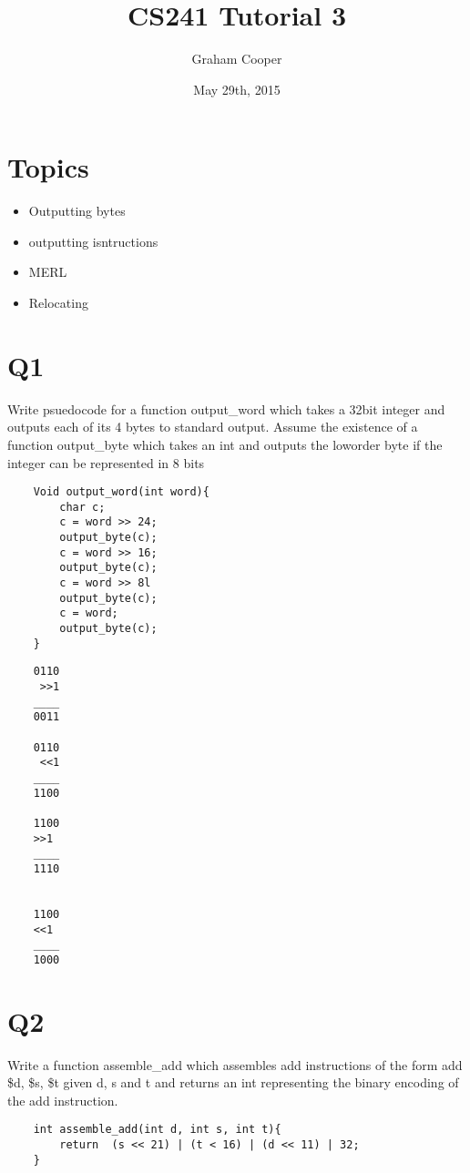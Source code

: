 \documentclass[12pt]{article}
\title{\vspace{-15ex}CS241 Tutorial 3\vspace{-1ex}}
\date{May 29th, 2015}
\author{Graham Cooper}
\begin{document}
	\maketitle
	\section*{Topics}
	\begin{itemize}
		\item Outputting bytes
		\item outputting isntructions
		\item MERL
		\item Relocating
	\end{itemize}
	
	\section*{Q1}
	Write psuedocode for a function output\_word which takes a 32\-bit integer and outputs each of its 4 bytes to standard output. Assume the existence of a function output\_byte which takes an int and outputs the low\-order byte if the integer can be represented in 8 bits\\
	
	\begin{verbatim}
	Void output_word(int word){
		char c;
		c = word >> 24;
		output_byte(c);
		c = word >> 16;
		output_byte(c);
		c = word >> 8l
		output_byte(c);
		c = word;
		output_byte(c);
	}
	\end{verbatim}
	
	\begin{verbatim}
	0110
	 >>1
	____
	0011
	
	0110
	 <<1
	____
	1100
	
	1100
	>>1
	____
	1110
	
	
	1100
	<<1
	____
	1000
	\end{verbatim}
	
	\section*{Q2}
	Write a function assemble\_add which assembles add instructions of the form add \$d, \$s, \$t given d, s and t and returns an int representing the binary encoding of the add instruction.
	
	
	\begin{verbatim}
	int assemble_add(int d, int s, int t){
		return  (s << 21) | (t < 16) | (d << 11) | 32;
	}
	\end{verbatim}
	
\end{document}
